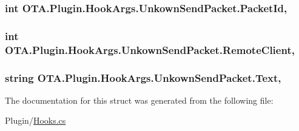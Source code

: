 \subsubsection[{Packet\+Id}]{\setlength{\rightskip}{0pt plus 5cm}int O\+T\+A.\+Plugin.\+Hook\+Args.\+Unkown\+Send\+Packet.\+Packet\+Id\hspace{0.3cm}{\ttfamily [get]}, {\ttfamily [set]}}\label{struct_o_t_a_1_1_plugin_1_1_hook_args_1_1_unkown_send_packet_adf115b5aa3acd24a2e6d72eeab047220}
\hypertarget{struct_o_t_a_1_1_plugin_1_1_hook_args_1_1_unkown_send_packet_a28a968662d664ae695f565c824cf07e5}{}
\subsubsection[{Remote\+Client}]{\setlength{\rightskip}{0pt plus 5cm}int O\+T\+A.\+Plugin.\+Hook\+Args.\+Unkown\+Send\+Packet.\+Remote\+Client\hspace{0.3cm}{\ttfamily [get]}, {\ttfamily [set]}}\label{struct_o_t_a_1_1_plugin_1_1_hook_args_1_1_unkown_send_packet_a28a968662d664ae695f565c824cf07e5}
\hypertarget{struct_o_t_a_1_1_plugin_1_1_hook_args_1_1_unkown_send_packet_a1c384008f4154148c24c1def39525bb2}{}
\subsubsection[{Text}]{\setlength{\rightskip}{0pt plus 5cm}string O\+T\+A.\+Plugin.\+Hook\+Args.\+Unkown\+Send\+Packet.\+Text\hspace{0.3cm}{\ttfamily [get]}, {\ttfamily [set]}}\label{struct_o_t_a_1_1_plugin_1_1_hook_args_1_1_unkown_send_packet_a1c384008f4154148c24c1def39525bb2}


The documentation for this struct was generated from the following file\+:\begin{DoxyCompactItemize}
\item 
Plugin/\hyperlink{_hooks_8cs}{Hooks.\+cs}\end{DoxyCompactItemize}
